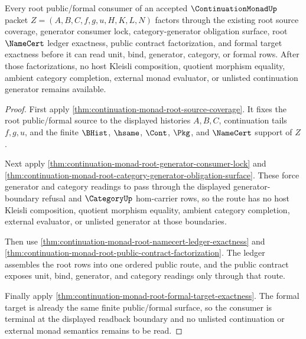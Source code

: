 \begin{theorem}
\label{thm:continuation-monad-root-formal-public-readback-terminality}
Every root public/formal consumer of an accepted $\ContinuationMonadUp$ packet
$Z=(A,B,C,f,g,u,H,K,L,N)$ factors through the existing root source coverage,
generator consumer lock, category-generator obligation surface, root
$\NameCert$ ledger exactness, public contract factorization, and formal target
exactness before it can read unit, bind, generator, category, or formal rows.
After those factorizations, no host Kleisli composition, quotient morphism
equality, ambient category completion, external monad evaluator, or unlisted
continuation generator remains available.
\end{theorem}
\begin{proof}
First apply \autoref{thm:continuation-monad-root-source-coverage}. It fixes the
root public/formal source to the displayed histories $A,B,C$, continuation
tails $f,g,u$, and the finite $\BHist$, $\hsame$, $\Cont$, $\Pkg$, and
$\NameCert$ support of $Z$.

Next apply \autoref{thm:continuation-monad-root-generator-consumer-lock} and
\autoref{thm:continuation-monad-root-category-generator-obligation-surface}.
These force generator and category readings to pass through the displayed
generator-boundary refusal and $\CategoryUp$ hom-carrier rows, so the route has
no host Kleisli composition, quotient morphism equality, ambient category
completion, external evaluator, or unlisted generator at those boundaries.

Then use \autoref{thm:continuation-monad-root-namecert-ledger-exactness} and
\autoref{thm:continuation-monad-root-public-contract-factorization}. The ledger
assembles the root rows into one ordered public route, and the public contract
exposes unit, bind, generator, and category readings only through that route.

Finally apply \autoref{thm:continuation-monad-root-formal-target-exactness}.
The formal target is already the same finite public/formal surface, so the
consumer is terminal at the displayed readback boundary and no unlisted
continuation or external monad semantics remains to be read.
\end{proof}

